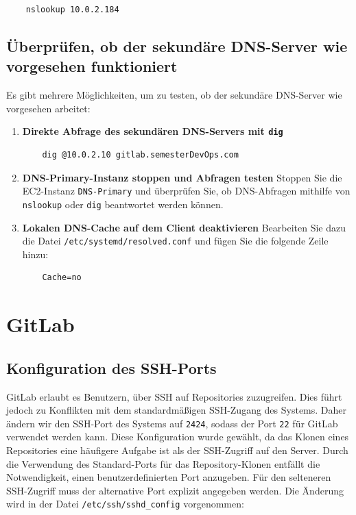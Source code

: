 \documentclass[a4paper,12pt]{article}
\begin{document}
\begin{verbatim}
	nslookup 10.0.2.184
\end{verbatim}


\subsection{Überprüfen, ob der sekundäre DNS-Server wie vorgesehen funktioniert}  
Es gibt mehrere Möglichkeiten, um zu testen, ob der sekundäre DNS-Server wie vorgesehen arbeitet:  

\begin{enumerate}  
    \item \textbf{Direkte Abfrage des sekundären DNS-Servers mit \texttt{dig}}  
    \begin{verbatim}
    dig @10.0.2.10 gitlab.semesterDevOps.com
    \end{verbatim}  

    \item \textbf{DNS-Primary-Instanz stoppen und Abfragen testen}  
    Stoppen Sie die EC2-Instanz \texttt{DNS-Primary} und überprüfen Sie, ob DNS-Abfragen mithilfe von \texttt{nslookup} oder \texttt{dig} beantwortet werden können.  

    \item \textbf{Lokalen DNS-Cache auf dem Client deaktivieren}  
    Bearbeiten Sie dazu die Datei \texttt{/etc/systemd/resolved.conf} und fügen Sie die folgende Zeile hinzu:  
    \begin{verbatim}
    Cache=no
    \end{verbatim}  
\end{enumerate} 




\newpage

\section{GitLab}

\subsection{Konfiguration des SSH-Ports}
GitLab erlaubt es Benutzern, über SSH auf Repositories zuzugreifen. Dies führt jedoch zu Konflikten mit dem standardmäßigen SSH-Zugang des Systems. Daher ändern wir den SSH-Port des Systems auf \texttt{2424}, sodass der Port \texttt{22} für GitLab verwendet werden kann.
Diese Konfiguration wurde gewählt, da das Klonen eines Repositories eine häufigere Aufgabe ist als der SSH-Zugriff auf den Server. Durch die Verwendung des Standard-Ports für das Repository-Klonen entfällt die Notwendigkeit, einen benutzerdefinierten Port anzugeben. Für den selteneren SSH-Zugriff muss der alternative Port explizit angegeben werden.
Die Änderung wird in der Datei \texttt{/etc/ssh/sshd\_config} vorgenommen:
\end{document}
